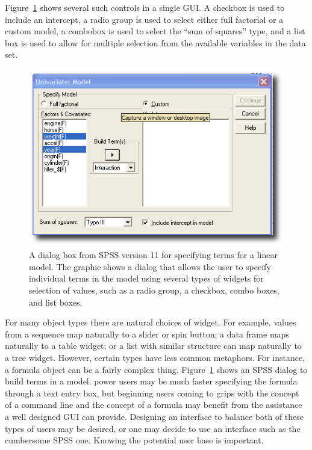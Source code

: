 Figure~\ref{fig:GUI:spss-11-term-selection} shows several such
controls in a single GUI. A checkbox is used to include an intercept,
a radio group is used to select either full factorial or a custom
model, a combobox is used to select the ``sum of squares'' type, and a
list box is used to allow for multiple selection from the available
variables in the data set. 



\begin{figure}
  \centering
  \includegraphics[width=.65\textwidth]{spss-11-model-selection}
 \caption{A dialog box from SPSS version 11 for specifying terms
    for a linear model. The graphic shows a dialog that allows
    the user to specify individual terms in the model  using
    several types of widgets for selection of values, such as a radio
    group, a checkbox, combo boxes, and list boxes. }
  \label{fig:GUI:spss-11-term-selection}
\end{figure}

For many \R\/ object types there are natural choices of widget. For
example, values from a sequence map naturally to a slider or spin
button; a data frame maps naturally to a table widget; or a list with
similar structure can map naturally to a tree widget. However, certain
\R\/ types have less common metaphors. For instance, a formula object
can be a fairly complex
thing. Figure~\ref{fig:GUI:spss-11-term-selection} shows an SPSS dialog to
build terms in a model. \R\/ power users may be much faster specifying
the formula through a text entry box, but beginning \R\/ users coming
to grips with the concept of a command line and the concept of a
formula may benefit from the assistance a well designed GUI can
provide. Designing an interface to balance both of these types of
users may be desired, or one may decide to use an interface such as
the cumbersome SPSS one. Knowing the potential user base is important.







